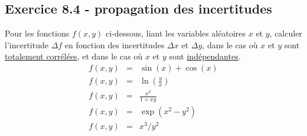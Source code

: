 \subsection*{Exercice 8.4 - propagation des incertitudes}

Pour les fonctions $f(x,y)$ ci-dessous, liant les variables aléatoires $x$ et $y$, calculer l'incertitude $\Delta f$ en fonction des incertitudes $\Delta x$ et $\Delta y$, dans le cas où $x$ et $y$ sont \underline{totalement corrélées}, et dans le cas où $x$ et $y$ sont \underline{indépendantes}.
\begin{eqnarray*}
f(x,y)&=&\sin(x)+\cos(x) \\
f(x,y)&=&\ln\left(\frac{y}{x}\right) \\
f(x,y)&=&\frac{x^2}{1+xy} \\
f(x,y)&=&\exp(x^2-y^2) \\
f(x,y)&=&x^3/y^2 \\
\end{eqnarray*}